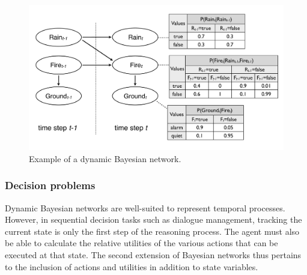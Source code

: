 \begin{figure}[h]
\centering
\includegraphics[scale=0.25]{imgs/dbn.pdf}
\caption{Example of a dynamic Bayesian network. }
\label{fig:dbn}
\end{figure}



\subsubsection*{Decision problems}

Dynamic Bayesian networks are well-suited to represent temporal processes.  However, in sequential decision tasks such as dialogue management, tracking the current state is only the first step of the reasoning process. The agent must also be able to calculate the relative utilities of the various actions that can be executed at that  state. The second extension of Bayesian networks thus pertains to the inclusion of actions and utilities in addition to state variables.  

